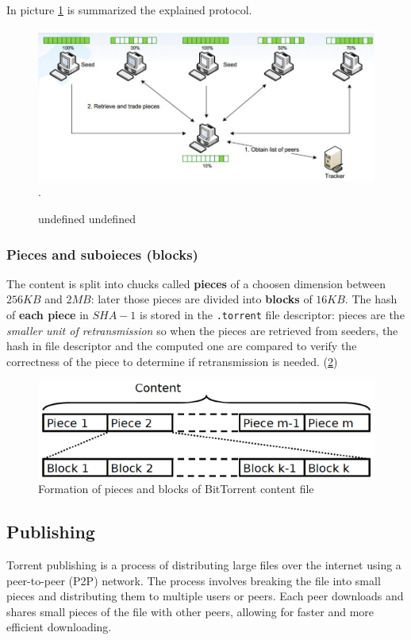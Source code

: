 \documentclass[10pt,a4paper]{report}
\begin{document}
In picture \ref{block-eg} is summarized the explained protocol.
\begin{figure}[b!]
	\centering
	\includegraphics[scale=0.50]{images/Pasted image 20230311094713.png}
.	\caption{undefined undefined}
	\label{block-eg}
\end{figure}


\subsubsection{Pieces and suboieces (blocks)}\label{sec:pieces-and-suboieces-blocks}
The content is split into chucks called \textbf{pieces} of a choosen dimension between $256KB$ and $2MB$: later those pieces are divided into \textbf{blocks} of $16KB$.
The hash of \textbf{each piece} in $SHA-1$ is stored in the \texttt{.torrent} file descriptor: pieces are the \textit{smaller unit of retransmission} so when the pieces are retrieved from seeders, the hash in file descriptor and the computed one are compared to verify the correctness of the piece to determine if retransmission is needed. (\ref{block-image})

	\begin{figure}[h!]
		\centering
	\includegraphics[scale=0.60]{images/Pasted image 20230311094937.png}
	\caption{Formation of pieces and blocks of BitTorrent content file}
	\label{block-image}
	
\end{figure}

\subsection{Publishing}\label{sec:publishing}
Torrent publishing is a process of distributing large files over the internet using a peer-to-peer (P2P) network. The process involves breaking the file into small pieces and distributing them to multiple users or peers. Each peer downloads and shares small pieces of the file with other peers, allowing for faster and more efficient downloading.
\end{document}

